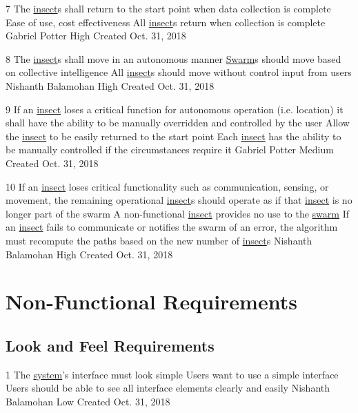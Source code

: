 \documentclass[11pt]{article}
\begin{document}
\functionalRequirement
{7}
{The \hyperref[sec:definitions]{insect}s shall return to the start point when data collection is complete}
{Ease of use, cost effectiveness}
{All \hyperref[sec:definitions]{insect}s return when collection is complete}
{Gabriel Potter}
{High}
{Created Oct. 31, 2018}

\functionalRequirement
{8}
{The \hyperref[sec:definitions]{insect}s shall move in an autonomous manner}
{\hyperref[sec:definitions]{Swarm}s should move based on collective intelligence}
{All \hyperref[sec:definitions]{insect}s should move without control input from users}
{Nishanth Balamohan}
{High}
{Created Oct. 31, 2018}

\functionalRequirement
{9}
{If an \hyperref[sec:definitions]{insect} loses a critical function for autonomous operation (i.e. location) it shall have the ability to be manually overridden and controlled by the user}
{Allow the \hyperref[sec:definitions]{insect} to be easily returned to the start point}
{Each \hyperref[sec:definitions]{insect} has the ability to be manually controlled if the circumstances require it}
{Gabriel Potter}
{Medium}
{Created Oct. 31, 2018}

\functionalRequirement
{10}
{If an \hyperref[sec:definitions]{insect} loses critical functionality such as communication, sensing, or movement, the remaining operational \hyperref[sec:definitions]{insect}s should operate as if that \hyperref[sec:definitions]{insect} is no longer part of the swarm}
{A non-functional \hyperref[sec:definitions]{insect} provides no use to the \hyperref[sec:definitions]{swarm}}
{If an \hyperref[sec:definitions]{insect} fails to communicate or notifies the swarm of an error, the algorithm must recompute the paths based on the new number of \hyperref[sec:definitions]{insect}s}
{Nishanth Balamohan}
{High}
{Created Oct. 31, 2018}

\section{Non-Functional Requirements}

\subsection{Look and Feel Requirements}
\nonFunctionalRequirement
{1}
{The \hyperref[sec:definitions]{system}'s interface must look simple}
{Users want to use a simple interface}
{Users should be able to see all interface elements clearly and easily}
{Nishanth Balamohan}
{Low}
{Created Oct. 31, 2018}
\end{document}
